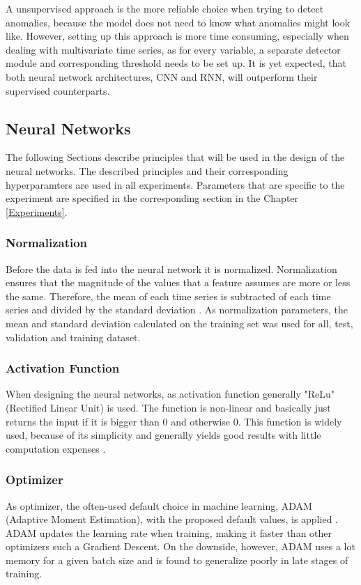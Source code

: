 A unsupervised approach is the more reliable choice when trying to detect anomalies, because the model does not need to know what anomalies might look like. However, setting up this approach is more time consuming, especially when dealing with multivariate time series, as for every variable, a separate detector module and corresponding threshold needs to be set up. It is yet expected, that both neural network architectures, CNN and RNN, will outperform their supervised counterparts. 

\subsection{Neural Networks}
The following Sections describe principles that will be used in the design of the neural networks. The described principles and their corresponding hyperparamters are used in all experiments. Parameters that are specific to the experiment are specified in the corresponding section in the Chapter \ref{Experiments}. 

\subsubsection{Normalization}
Before the data is fed into the neural network it is normalized. Normalization ensures that the magnitude of the values that a feature assumes are more or less the same. Therefore, the mean of each time series is subtracted of each time series and divided by the standard deviation \parencite{Stöttner2019}. As normalization parameters, the mean and standard deviation calculated on the training set was used for all, test, validation and training dataset.  

\subsubsection{Activation Function}
When designing the neural networks, as activation function generally "ReLu" (Rectified Linear Unit) is used. The function is non-linear and basically just returns the input if it is bigger than 0 and otherwise 0. This function is widely used, because of its simplicity and generally yields good results with little computation expenses \parencite{Brownlee2019.2}.  

\subsubsection{Optimizer}
As optimizer, the often-used default choice in machine learning, ADAM (Adaptive Moment Estimation), with the proposed default values, is applied \parencite{Katanforoosh2019}. ADAM updates the learning rate when training, making it faster than other optimizers such a Gradient Descent. On the downside, however, ADAM uses a lot memory for a given batch size and is found to generalize poorly in late stages of training.

